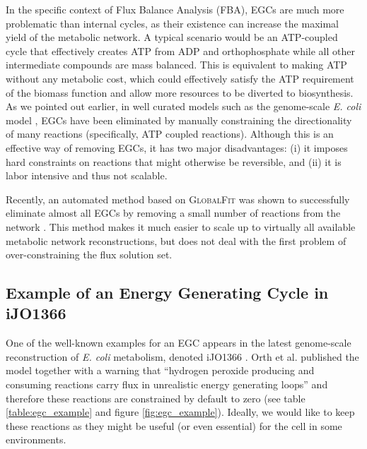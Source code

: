 \documentclass[twocolumn]{bmcart}%
\begin{document}
In the specific context of Flux Balance Analysis (FBA), EGCs are much more problematic than internal cycles, as their existence can increase the maximal yield of the metabolic network. A typical scenario would be an ATP-coupled cycle that effectively creates ATP from ADP and orthophosphate while all other intermediate compounds are mass balanced. This is equivalent to making ATP without any metabolic cost, which could effectively satisfy the ATP requirement of the biomass function and allow more resources to be diverted to biosynthesis. As we pointed out earlier, in well curated models such as the genome-scale \emph{E. coli} model \cite{Carrera2014-ys}, EGCs have been eliminated by manually constraining the directionality of many reactions (specifically, ATP coupled reactions). Although this is an effective way of removing EGCs, it has two major disadvantages: (i) it imposes hard constraints on reactions that might otherwise be reversible, and (ii) it is labor intensive and thus not scalable.

Recently, an automated method based on \textsc{GlobalFit} was shown to successfully eliminate almost all EGCs by removing a small number of reactions from the network \cite{Fritzemeier2017-ba}. This method makes it much easier to scale up to virtually all available metabolic network reconstructions, but does not deal with the first problem of over-constraining the flux solution set.

\subsection*{Example of an Energy Generating Cycle in iJO1366}
One of the well-known examples for an EGC appears in the latest genome-scale reconstruction of \emph{E. coli} metabolism, denoted iJO1366 \cite{Orth2011-qi}. Orth et al. published the model together with a warning that ``hydrogen peroxide producing and consuming reactions carry flux in unrealistic energy generating loops'' and therefore these reactions are constrained by default to zero (see table \ref{table:egc_example} and figure \ref{fig:egc_example}). Ideally, we would like to keep these reactions as they might be useful (or even essential) for the cell in some environments.
\end{document}
